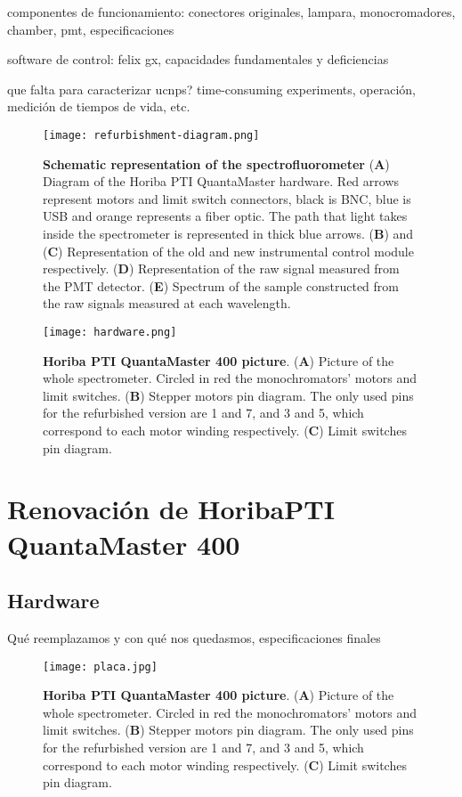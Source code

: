 componentes de funcionamiento: conectores originales, lampara, monocromadores, chamber, pmt, especificaciones

software de control: felix gx, capacidades fundamentales y deficiencias

que falta para caracterizar ucnps? time-consuming experiments, operación, medición de tiempos de vida, etc.

\begin{figure}[btp]
     \centering
     \texttt{[image: refurbishment-diagram.png]}
     \caption{
    \textbf{Schematic representation of the spectrofluorometer}
    (\textbf{A}) Diagram of the Horiba PTI QuantaMaster hardware. Red arrows represent motors and limit switch connectors, black is BNC, blue is USB and orange represents a fiber optic. The path that light takes inside the spectrometer is represented in thick blue arrows. 
    (\textbf{B}) and (\textbf{C}) Representation of the old and new instrumental control module respectively.
    (\textbf{D}) Representation of the raw signal measured from the PMT detector.
    (\textbf{E}) Spectrum of the sample constructed from the raw signals measured at each wavelength.
    }
     \label{fig:ref-diagram}
\end{figure}

\begin{figure}[h]
     \centering
     \texttt{[image: hardware.png]}
     \caption{\textbf{Horiba PTI QuantaMaster 400 picture}.  (\textbf{A}) Picture of the whole spectrometer. Circled in red the monochromators' motors and limit switches. (\textbf{B}) Stepper motors pin diagram. The only used pins for the refurbished version are 1 and 7, and 3 and 5, which correspond to each motor winding respectively. (\textbf{C}) Limit switches pin diagram.}
     \label{fig:hardware}
\end{figure}


\section{Renovación de HoribaPTI QuantaMaster 400}
\subsection{Hardware }


Qué reemplazamos y con qué nos quedasmos, especificaciones finales

\begin{figure}[h]
     \centering
     \texttt{[image: placa.jpg]}
     \caption{\textbf{Horiba PTI QuantaMaster 400 picture}.  (\textbf{A}) Picture of the whole spectrometer. Circled in red the monochromators' motors and limit switches. (\textbf{B}) Stepper motors pin diagram. The only used pins for the refurbished version are 1 and 7, and 3 and 5, which correspond to each motor winding respectively. (\textbf{C}) Limit switches pin diagram.}
     \label{fig:placa}
\end{figure}

